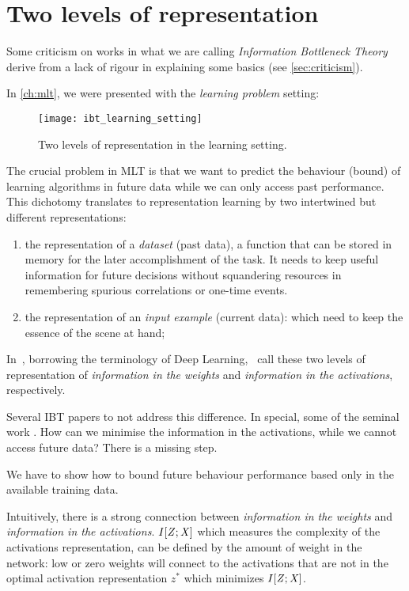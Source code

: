 \section{Two levels of representation}\label{sec:2_levels}
Some criticism on works in what we are calling \emph{Information Bottleneck Theory} derive from a lack of rigour in explaining some basics (see \cref{sec:criticism}).

In \cref{ch:mlt}, we were presented with the \emph{learning problem} setting:
\begin{figure}[ht] \centering
    \texttt{[image: ibt\_learning\_setting]}
    \caption{Two levels of representation in the learning setting.}\label{fig:two_levels_representation}
\end{figure}

The crucial problem in \ac*{MLT} is that we want to predict the behaviour (bound) of learning algorithms in future data while we can only access past performance. This dichotomy translates to representation learning by two intertwined but different representations:
\begin{enumerate}%
  \item the representation of a \emph{dataset} (past data), a function that can be stored in memory for the later accomplishment of the task. It needs to keep useful information for future decisions without squandering resources in remembering spurious correlations or one-time events.
  \item the representation of an \emph{input example} (current data): which need to keep the essence of the scene at hand;
\end{enumerate}

In~\cite{achille:2019phd, achille:2019weights}, borrowing the terminology of Deep Learning,~\citeauthor{achille:2019phd} call these two levels of representation of \emph{information in the weights} and \emph{information in the activations}, respectively.

Several \ac{IBT} papers to not address this difference. In special, some of the seminal work \cite{tishby:2015, shwartz-ziv:2017, tishby:2017}. How can we minimise the information in the activations, while we cannot access future data? There is a missing step.

We have to show how to bound future behaviour performance based only in the available training data.

Intuitively, there is a strong connection between  \emph{information in the weights} and \emph{information in the activations}. $I[{{\mathit{Z}}};{{\mathit{X}}}]$ which  measures the complexity of the activations representation, can be defined by the amount of weight in the network: low or zero weights will connect to the activations that are not in the optimal activation representation $z^*$ which minimizes $I[{{\mathit{Z}}};{{\mathit{X}}}]$.

